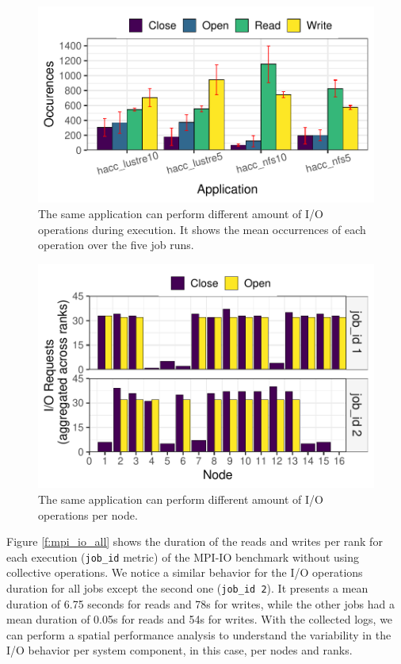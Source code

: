 \begin{figure}
	\centering
        \includegraphics[width=\linewidth]{figs/operations_hacc.pdf}
	\caption{The same application can perform different amount of
          I/O operations during execution. It shows the mean
          occurrences of each operation over the five job runs.}
	\label{f:hacc}
\end{figure}

\begin{figure}
	\centering
        \includegraphics[width=\linewidth]{figs/hacc_nfs_10.pdf}
	\caption{The same application can perform different amount of
          I/O operations per node.}
	\label{f:hacc2}
\end{figure}

Figure \ref{f:mpi_io_all} shows the duration of the reads and writes
per rank for each execution (\texttt{job\_id} metric) of the MPI-IO
benchmark without using collective operations. We notice a similar
behavior for the I/O operations duration for all jobs except the
second one (\texttt{job\_id 2}). It presents a mean duration of 6.75
seconds for reads and 78s for writes, while the other jobs had a mean
duration of 0.05s for reads and 54s for writes. With the collected
logs, we can perform a spatial performance analysis to understand the
variability in the I/O behavior per system component, in this case,
per nodes and ranks.
      
